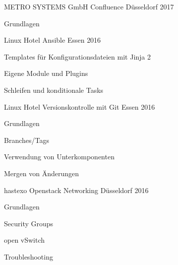 

\begin{cventries}

  \cventry
    {METRO SYSTEMS GmbH} %
    {Confluence} %
    {Düsseldorf} %
    {2017} %
    {
      \begin{cvitems} %
        \item {Grundlagen}
      \end{cvitems}
    }

  \cventry
    {Linux Hotel} %
    {Ansible} %
    {Essen} %
    {2016} %
    {
      \begin{cvitems} %
        \item {Templates für Konfigurationsdateien mit Jinja 2}
        \item {Eigene Module und Plugins}
        \item {Schleifen und konditionale Tasks}
      \end{cvitems}
    }
    
  \cventry
    {Linux Hotel} %
    {Versionskontrolle mit Git} %
    {Essen} %
    {2016} %
    {
      \begin{cvitems} %
        \item {Grundlagen}
        \item {Branches/Tags}
        \item {Verwendung von Unterkomponenten}
        \item {Mergen von Änderungen}
      \end{cvitems}
    }
    
  \cventry
    {hastexo} %
    {Openstack Networking} %
    {Düsseldorf} %
    {2016} %
    {
      \begin{cvitems} %
        \item {Grundlagen}
        \item {Security Groups}
        \item {open vSwitch}
        \item {Troubleshooting}
      \end{cvitems}
    }
    

\end{cventries}
